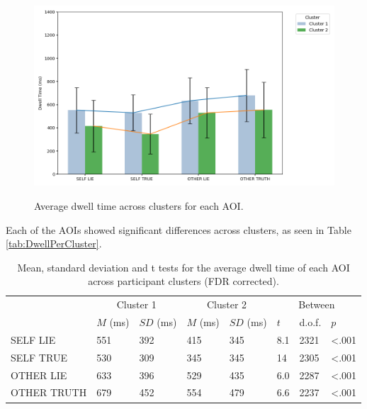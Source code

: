 \documentclass[man, floatsintext]{apa7}
\begin{document}
\begin{figure}[H]
	\caption{Average dwell time across clusters for each AOI.}
	\includegraphics[width=\linewidth]{../plots/ALLTRIAL/DwellTimes.png}
	\label{fig:DwellTimesPerCluster}
\end{figure}

Each of the AOIs showed significant differences across clusters, as seen in Table \ref{tab:DwellPerCluster}.

\begin{table}[H]
	\centering
	\begin{tabular}{|p{1.4cm}|p{1cm}|p{1cm}|p{1cm}|p{1cm}|p{1cm}|p{1cm}|p{1cm}|}
			\hline
			\multirow{2}{*}{} & \multicolumn{2}{c|}{Cluster 1} & \multicolumn{2}{c|}{Cluster 2} & \multicolumn{3}{c|}{Between} \\ \cline{2-8}
			& $M$ (ms) &$SD$ (ms) & $M$ (ms) & $SD$ (ms)  & $t$ & d.o.f. & $p$   \\ \hline
			\small{SELF LIE}& 551 & 392 & 415 & 345 & 8.1 & 2321 & <.001  \\ \hline
			\small{SELF TRUE} & 530 & 309 & 345 & 345& 14 & 2305  &  <.001 \\ \hline
			\small{OTHER LIE} & 633 & 396 &529 & 435 & 6.0 & 2287 &  <.001  \\ \hline
			\small{OTHER TRUTH} & 679 & 452 & 554 & 479 & 6.6 & 2237 &  <.001 \\ \hline
		\end{tabular}
	\vspace{0.3cm}
	\caption{Mean, standard deviation and t tests for the average dwell time of each AOI across participant clusters (FDR corrected).}
	\label{tab:DwellTimesPerCluster}
\end{table}
\end{document}
